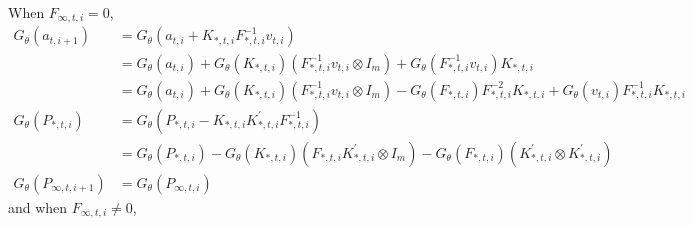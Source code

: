 \documentclass[12pt]{article}
\newcommand{\Gt}{G_\theta}
\begin{document}
	When $F_{\infty,t,i} = 0$, 
	\begin{align*}
	\Gt(a_{t,i+1}) &= \Gt(a_{t,i} + K_{*,t,i} F_{*,t,i}^{-1} v_{t,i}) \\
	&= \Gt(a_{t,i}) + \Gt(K_{*,t,i})(F_{*,t,i}^{-1} v_{t,i} \otimes I_m) + \Gt(F_{*,t,i}^{-1} v_{t,i}) K_{*,t,i}  \\
	&= \Gt(a_{t,i}) + \Gt(K_{*,t,i})(F_{*,t,i}^{-1} v_{t,i} \otimes I_m) - \Gt(F_{*,t,i}) F_{*,t,i}^{-2} K_{*,t,i} + \Gt(v_{t,i}) F_{*,t,i}^{-1} K_{*,t,i}  \\
	\Gt(P_{*,t,i}) &= \Gt(P_{*,t,i} - K_{*,t,i} K_{*,t,i}^\prime F_{*,t,i}^{-1}) \\
	&= \Gt(P_{*,t,i}) - \Gt(K_{*,t,i})(F_{*,t,i}K_{*,t,i}^\prime \otimes I_m) - \Gt(F_{*,t,i})(K_{*,t,i}^\prime \otimes K_{*,t,i}^\prime) \\
	\Gt(P_{\infty,t,i+1}) &= \Gt(P_{\infty,t,i}) 
	\end{align*}
	and when $F_{\infty,t,i} \neq 0$, 
\end{document}
